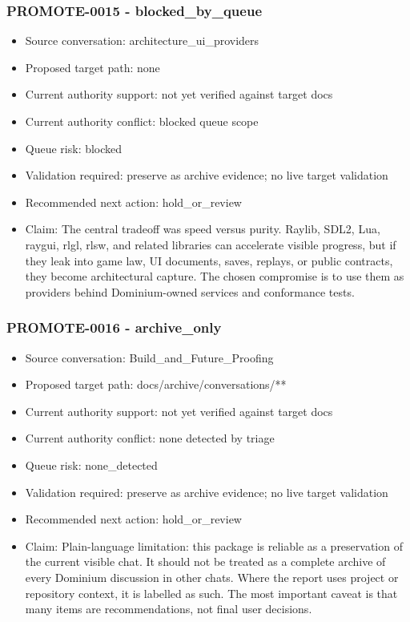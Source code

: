 \documentclass[11pt,a4paper]{report}
\begin{document}
\subsubsection{PROMOTE-0015 - blocked\_by\_queue}

\begin{itemize}
\item Source conversation: architecture\_ui\_providers
\item Proposed target path: none
\item Current authority support: not yet verified against target docs
\item Current authority conflict: blocked queue scope
\item Queue risk: blocked
\item Validation required: preserve as archive evidence; no live target validation
\item Recommended next action: hold\_or\_review
\item Claim: The central tradeoff was speed versus purity. Raylib, SDL2, Lua, raygui, rlgl, rlsw, and related libraries can accelerate visible progress, but if they leak into game law, UI documents, saves, replays, or public contracts, they become architectural capture. The chosen compromise is to use them as providers behind Dominium-owned services and conformance tests.
\end{itemize}

\subsubsection{PROMOTE-0016 - archive\_only}

\begin{itemize}
\item Source conversation: Build\_and\_Future\_Proofing
\item Proposed target path: docs/archive/conversations/**
\item Current authority support: not yet verified against target docs
\item Current authority conflict: none detected by triage
\item Queue risk: none\_detected
\item Validation required: preserve as archive evidence; no live target validation
\item Recommended next action: hold\_or\_review
\item Claim: Plain-language limitation: this package is reliable as a preservation of the current visible chat. It should not be treated as a complete archive of every Dominium discussion in other chats. Where the report uses project or repository context, it is labelled as such. The most important caveat is that many items are recommendations, not final user decisions.
\end{itemize}
\end{document}
